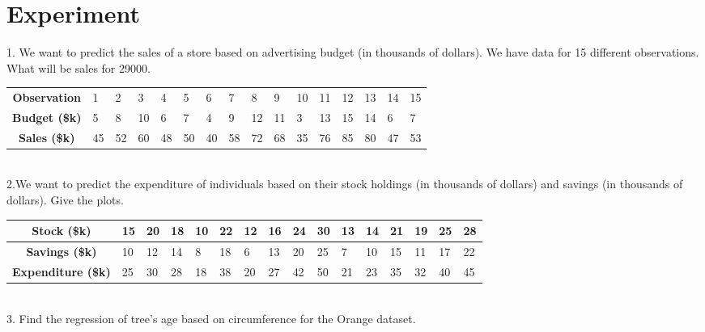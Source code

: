 \documentclass{article}\usepackage[]{graphicx}\usepackage[]{xcolor}
\begin{document}
\section*{Experiment}
1. We want to predict the sales of a store based on advertising budget (in thousands of dollars). We have data for 15 different observations. What will be sales for 29000.
\begin{table}[h]
\begin{tabular}{clllllllllllllll}
\textbf{Observation}              & 1  & 2  & 3  & 4  & 5  & 6  & 7  & 8  & 9  & 10 & 11 & 12 & 13 & 14 & 15 \\
\textbf{ Budget (\$k)} & 5  & 8  & 10 & 6  & 7  & 4  & 9  & 12 & 11 & 3  & 13 & 15 & 14 & 6  & 7  \\
\textbf{Sales (\$k)}              & 45 & 52 & 60 & 48 & 50 & 40 & 58 & 72 & 68 & 35 & 76 & 85 & 80 & 47 & 53
\end{tabular}
\end{table}
\\
2.We want to predict the expenditure of individuals based on their stock holdings (in thousands of dollars) and savings (in thousands of dollars). Give the plots.
\begin{table}[h]
\begin{tabular}{|c|l|l|l|l|l|l|l|l|l|l|l|l|l|l|l|}
\hline
\textbf{Stock (\$k)}       & 15 & 20 & 18 & 10 & 22 & 12 & 16 & 24 & 30 & 13 & 14 & 21 & 19 & 25 & 28 \\ \hline
\textbf{Savings (\$k)}     & 10 & 12 & 14 & 8  & 18 & 6  & 13 & 20 & 25 & 7  & 10 & 15 & 11 & 17 & 22 \\ \hline
\textbf{Expenditure (\$k)} & 25 & 30 & 28 & 18 & 38 & 20 & 27 & 42 & 50 & 21 & 23 & 35 & 32 & 40 & 45 \\ \hline
\end{tabular}
\end{table}
\\





3. Find the regression of tree's age based on circumference for the Orange  dataset. 
\end{document}
